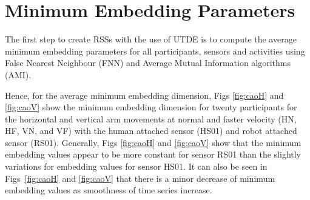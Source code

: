 \section{Minimum Embedding Parameters}


The first step to create RSSs with the use of UTDE is to compute the
average minimum embedding parameters for all participants, sensors and 
activities using False Nearest Neighbour (FNN) and 
Average Mutual Information algorithms (AMI).

Hence, for the average minimum embedding dimension, 
Figs \ref{fig:caoH} and \ref{fig:caoV} show the minimum embedding 
dimension for twenty participants for the horizontal and vertical arm
movements at normal and faster velocity (HN, HF, VN, and VF) with the 
human attached sensor (HS01) and robot attached sensor (RS01).
Generally, Figs \ref{fig:caoH} and \ref{fig:caoV} show that the minimum 
embedding values appear to be more constant for sensor RS01 than the 
slightly variations for embedding values for sensor HS01.
It can also be seen in Figs~\ref{fig:caoH} and \ref{fig:caoV} that there 
is a minor decrease of minimum embedding values as smoothness of time 
series increase. 

